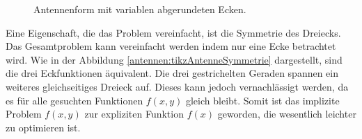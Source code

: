 \begin{figure}
\begin{minipage}[t]{0.45\textwidth}
		\caption{Antennenform mit variablen abgerundeten Ecken.}
		\label{antennen:tikabgerundet_kleiner}
	\end{minipage}%
\end{figure}
Eine Eigenschaft, die das Problem vereinfacht, ist die Symmetrie des Dreiecks. 
Das Gesamtproblem kann vereinfacht werden indem nur eine Ecke betrachtet wird. 
Wie in der Abbildung \ref{antennen:tikzAntenneSymmetrie} dargestellt, sind die drei Eckfunktionen äquivalent. Die drei 
gestrichelten Geraden spannen ein weiteres gleichseitiges Dreieck auf. Dieses kann jedoch vernachlässigt werden, da es für alle gesuchten Funktionen $f(x,y)$ 
gleich bleibt. Somit ist das implizite Problem $f(x,y)$ zur expliziten Funktion $f(x)$ 
geworden, die wesentlich leichter zu optimieren ist.








